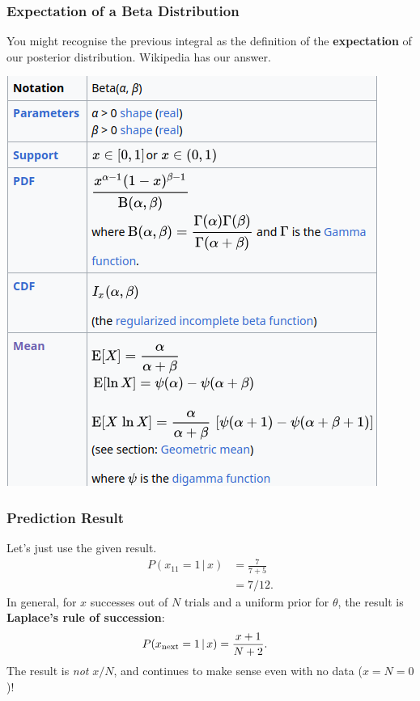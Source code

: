 \documentclass{beamer}
\newcommand{\given}{\,|\,}
\begin{document}
\begin{frame}
\frametitle{Expectation of a Beta Distribution}
You might recognise the previous integral as the definition of the
{\bf expectation} of our posterior distribution. Wikipedia has our answer.

\centering
\includegraphics[scale=0.3]{images/wikipedia.png}

\end{frame}


\begin{frame}
\frametitle{Prediction Result}
Let's just use the given result.
\begin{align}
P(x_{11} = 1 \given x) &= \frac{7}{7+5} \\
                       &= 7/12.
\end{align}\pause
In general, for $x$ successes out of $N$ trials and a uniform prior for
$\theta$, the result is {\bf Laplace's rule of succession}:
\begin{align}
P(x_{\rm next} = 1 \given x) &= \frac{x+1}{N+2}.
\end{align}\pause
The result is {\em not} $x/N$, and continues to make sense even with no data
($x=N=0$)!


\end{frame}
\end{document}
